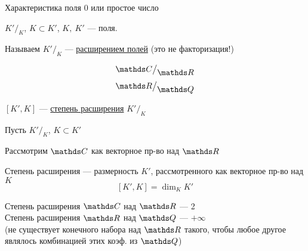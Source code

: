 \documentclass[main.tex]{subfiles}
\begin{document}
    \begin{reminder}
        Характеристика поля 0 или простое число
    \end{reminder}

    \begin{definition}
        $K'\big/_{\displaystyle K}$, $K \subset K'$, $K,\ K'$ --- поля.

        Называем $K'\big/_{\displaystyle K}$ --- \ul{расширением полей} (это не факторизация!)
    \end{definition}

    \begin{Example}
        \[\CC\big/_{\displaystyle \R}\]
        \[\R\big/_{\displaystyle \Q}\]
    \end{Example}

    \begin{definition}
        $[K', K]$ --- \ul{степень расширения} $K'\big/_{\displaystyle K}$
    \end{definition}

    Пусть $K'\big/_{\displaystyle K}$, $K \subset K'$

    Рассмотрим $\CC$ как векторное пр-во над $\R$

    \begin{remark}
        Степень расширения --- размерность $K'$, рассмотренного как векторное пр-во над $K$
        \[[K',K] = \dim_K K'\]
    \end{remark}

    \begin{example}
        Степень расширения $\CC$ над $\R$ --- 2\\
        Степень расширения $\R$ над $\Q$ --- $+\infty$ \\
        (не существует конечного набора над $\R$
        такого, чтобы любое другое являлось комбинацией этих коэф. из $\Q$)
    \end{example}
\end{document}
